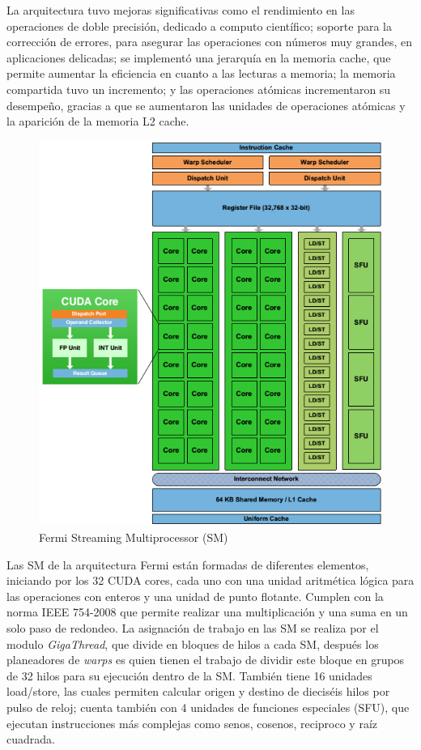 La arquitectura tuvo mejoras significativas como el rendimiento en las operaciones de doble precisión, dedicado a computo científico; soporte para la corrección de errores, para asegurar las operaciones con números muy grandes, en aplicaciones delicadas; se implementó una jerarquía en la memoria cache, que permite aumentar la eficiencia en cuanto a las  lecturas a memoria; la memoria compartida tuvo un incremento; y las operaciones atómicas incrementaron su desempeño, gracias a que se aumentaron las unidades de operaciones atómicas y la aparición de la memoria L2 cache. 

\begin{figure}[ph]
			\centering
				\includegraphics[scale=0.6]{img/fermiSM.png}
			\caption{Fermi Streaming Multiprocessor (SM)\cite{fermi}}
\end{figure}

Las SM de la arquitectura Fermi están formadas de diferentes elementos, iniciando por los 32 CUDA cores, cada uno con una unidad aritmética lógica para las operaciones con enteros y una unidad de punto flotante. Cumplen con la norma IEEE 754-2008 que permite realizar una multiplicación y una suma en un solo paso de redondeo. La asignación de trabajo en las SM se realiza por el modulo \textit{GigaThread}, que divide en bloques de hilos a cada SM, después los planeadores de \textit{warps} es quien tienen el trabajo de dividir este bloque en grupos de 32 hilos para su ejecución dentro de la SM. También tiene 16 unidades load/store, las cuales permiten calcular origen y destino de dieciséis hilos por pulso de reloj; cuenta también con 4 unidades de funciones especiales (SFU), que ejecutan instrucciones más complejas como senos, cosenos, reciproco y raíz cuadrada. 
\pagebreak
